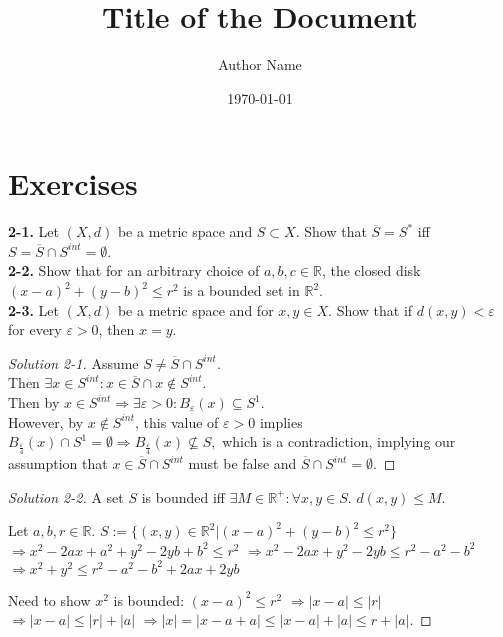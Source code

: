 \documentclass{article}
\title{\textbf{Title of the Document}}
\author{Author Name}
\date{\today}
\theoremstyle{definition}
\numberwithin{equation}{section}
\begin{document}
\maketitle
\tableofcontents
\newpage
\section{Exercises}
\textbf{2-1.} Let $(X,d)$ be a metric space and $S \subset X$. Show that $\overline{S} = S^*$ iff $S = \overline{S} \cap S^{int} = \emptyset$. \\
\textbf{2-2.} Show that for an arbitrary choice of $a,b,c \in \mathbb{R}$, the closed disk $(x - a)^2 + (y - b)^2 \leq r^2$ is a bounded set in $\mathbb{R}^2$. \\
\textbf{2-3.} Let $(X, d)$ be a metric space and for $x,y \in X$. Show that if $d(x, y) < \varepsilon$ for every $\varepsilon > 0$, then $x = y$.

\begin{proof}[Solution 2-1]
Assume $S \neq \overline{S} \cap S^{int}$. \\
Then $\exists x \in S^{int} : x \in \overline{S} \cap x \notin S^{int}$. \\
Then by $x \in S^{int} \Rightarrow \exists \varepsilon > 0 : B_{\varepsilon}(x) \subseteq S^1$. \\
However, by $x \notin S^{int}$, this value of $\varepsilon > 0$ implies 
$ 
B_{\frac{\varepsilon}{4}}(x) \cap S^1 = \emptyset \Rightarrow B_{\frac{\varepsilon}{4}}(x) \nsubseteq S,
$
which is a contradiction, implying our assumption that $x \in \overline{S} \cap S^{int}$ must be false and 
$ 
\overline{S} \cap S^{int} = \emptyset.
$
\end{proof}

\begin{proof}[Solution 2-2]
A set $S$ is bounded iff $\exists M \in \mathbb{R}^+ : \forall x,y \in S$.
$ 
d(x,y) \leq M.
$

Let $a,b,r \in \mathbb{R}$.
$
S:= \{(x,y) \in \mathbb{R}^2  |(x - a)^2 + (y - b)^2 \leq r^2\}
$
$
\Rightarrow x^2 - 2ax + a^2 + y^2 - 2yb + b^2 \leq r^2 
$
$
\Rightarrow x^2 - 2ax + y^2 - 2yb \leq r^2 - a^2 - b^2
$
$
\Rightarrow x^2 + y^2 \leq r^2 - a^2 - b^2 + 2ax + 2yb
$

Need to show $x^2$ is bounded:
$
(x - a)^2 \leq r^2
$
$
\Rightarrow |x - a| \leq |r| 
$
$
\Rightarrow |x - a| \leq |r| + |a| 
$
$
\Rightarrow |x| = |x - a + a| \leq |x - a| + |a| \leq r + |a|.
$

\end{proof}
\end{document}
